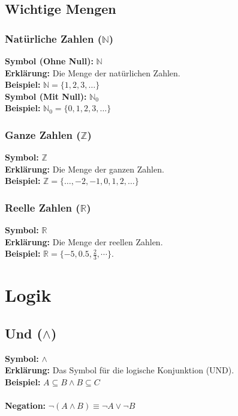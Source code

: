 \documentclass[12pt,a4paper]{article}
\begin{document}
\subsection{Wichtige Mengen}

\subsubsection{Natürliche Zahlen (\texorpdfstring{$\mathbb{N}$}{N})}
\textbf{Symbol (Ohne Null):} $\mathbb{N}$ \\
\textbf{Erklärung:} Die Menge der natürlichen Zahlen. \\
\textbf{Beispiel:} $\mathbb{N} = \{1,2,3,\dots\}$ \\
\textbf{Symbol (Mit Null):} $\mathbb{N}_0$ \\
\textbf{Beispiel:} $\mathbb{N}_0 = \{0, 1,2,3,\dots\}$

\subsubsection{Ganze Zahlen (\texorpdfstring{$\mathbb{Z}$}{Z})}
\textbf{Symbol:} $\mathbb{Z}$ \\
\textbf{Erklärung:} Die Menge der ganzen Zahlen. \\
\textbf{Beispiel:} $\mathbb{Z} = \{\dots,-2,-1,0,1,2,\dots\}$

\subsubsection{Reelle Zahlen (\texorpdfstring{$\mathbb{R}$}{R})}
\textbf{Symbol:} $\mathbb{R}$ \\
\textbf{Erklärung:} Die Menge der reellen Zahlen. \\
\textbf{Beispiel:} $\mathbb{R} = \{-5, 0.5, \frac{2}{3}, \cdots\}$.

\section{Logik}

\subsection{Und (\texorpdfstring{$\land$}{land})}
\textbf{Symbol:} $\land$ \\
\textbf{Erklärung:} Das Symbol für die logische Konjunktion (UND). \\
\textbf{Beispiel:} $A \subseteq B \land B \subseteq C$ \\ \\
\textbf{Negation:} $\neg (A \land B) \equiv \neg A \lor \neg B$
\end{document}
